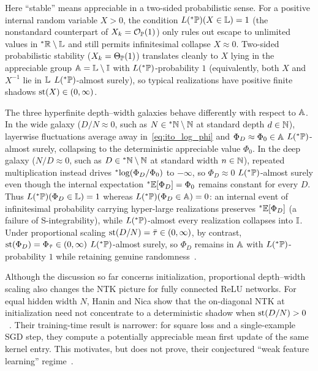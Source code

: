 Here ``stable'' means appreciable in a two-sided probabilistic sense. For a positive internal random variable $X > 0$, the condition $L({}^*\mathbb{P})(X \in \mathbb{L}) = 1$ (the nonstandard counterpart of $X_k = \mathcal{O}_{\mathbb{P}}(1)$) only rules out escape to unlimited values in ${}^*\mathbb{R} \setminus \mathbb{L}$ and still permits infinitesimal collapse $X \approx 0$. Two-sided probabilistic stability ($X_k = \Theta_{\mathbb{P}}(1)$) translates cleanly to $X$ lying in the appreciable group $\mathbb{A} = \mathbb{L} \setminus \mathbb{I}$ with $L({}^*\mathbb{P})$-probability $1$ (equivalently, both $X$ and $X^{-1}$ lie in $\mathbb{L}$ $L({}^*\mathbb{P})$-almost surely), so typical realizations have positive finite shadows $\operatorname{st}(X) \in (0, \infty)$.

The three hyperfinite depth--width galaxies behave differently with respect to $\mathbb{A}$. In the wide galaxy ($D/N \approx 0$, such as $N \in {}^*\mathbb{N} \setminus \mathbb{N}$ at standard depth $d \in \mathbb{N}$), layerwise fluctuations average away in~\eqref{eq:ito_log_phi} and $\Phi_D \approx \Phi_0 \in \mathbb{A}$ $L({}^*\mathbb{P})$-almost surely, collapsing to the deterministic appreciable value $\Phi_0$. In the deep galaxy ($N/D \approx 0$, such as $D \in {}^*\mathbb{N} \setminus \mathbb{N}$ at standard width $n \in \mathbb{N}$), repeated multiplication instead drives ${}^*\!\log(\Phi_D/\Phi_0)$ to $-\infty$, so $\Phi_D \approx 0$ $L({}^*\mathbb{P})$-almost surely even though the internal expectation ${}^*\mathbb{E}[\Phi_D] = \Phi_0$ remains constant for every $D$. Thus $L({}^*\mathbb{P})(\Phi_D \in \mathbb{L}) = 1$ whereas $L({}^*\mathbb{P})(\Phi_D \in \mathbb{A}) = 0$: an internal event of infinitesimal probability carrying hyper-large realizations preserves ${}^*\mathbb{E}[\Phi_D]$ (a failure of S-integrability), while $L({}^*\mathbb{P})$-almost every realization collapses into $\mathbb{I}$. Under proportional scaling $\operatorname{st}(D/N) = \bar{\tau} \in (0, \infty)$, by contrast, $\operatorname{st}(\Phi_D) = \Phi_{\bar{\tau}} \in (0, \infty)$ $L({}^*\mathbb{P})$-almost surely, so $\Phi_D$ remains in $\mathbb{A}$ with $L({}^*\mathbb{P})$-probability $1$ while retaining genuine randomness~\cite[\S1.1, Theorem~1, and Eq.~(9)]{hanin2020products}.

Although the discussion so far concerns initialization, proportional depth--width scaling also changes the NTK picture for fully connected ReLU networks. For equal hidden width $N$, Hanin and Nica show that the on-diagonal NTK at initialization need not concentrate to a deterministic shadow when $\operatorname{st}(D/N) > 0$~\cite[Theorem~1]{hanin2020finite}. Their training-time result is narrower: for square loss and a single-example SGD step, they compute a potentially appreciable mean first update of the same kernel entry. This motivates, but does not prove, their conjectured ``weak feature learning'' regime~\cite[Theorem~2 and \S3.2]{hanin2020finite}.

